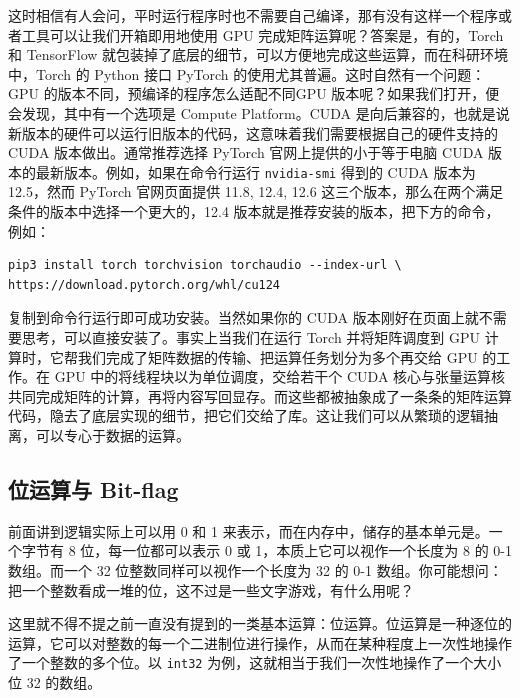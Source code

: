 这时相信有人会问，平时运行程序时也不需要自己编译，那有没有这样一个程序或者工具可以让我们开箱即用地使用 GPU 完成矩阵运算呢？答案是，有的，Torch 和 TensorFlow 就包装掉了底层的细节，可以方便地完成这些运算，而在科研环境中，Torch 的 Python 接口 PyTorch 的使用尤其普遍。这时自然有一个问题：GPU 的版本不同，预编译的程序怎么适配不同GPU 版本呢？如果我们打开，便会发现，其中有一个选项是 Compute Platform。CUDA 是向后兼容的，也就是说新版本的硬件可以运行旧版本的代码，这意味着我们需要根据自己的硬件支持的 CUDA 版本做出。通常推荐选择 PyTorch 官网上提供的小于等于电脑 CUDA 版本的最新版本。例如，如果在命令行运行 \texttt{nvidia-smi} 得到的 CUDA 版本为 12.5，然而 PyTorch 官网页面提供 11.8, 12.4, 12.6 这三个版本，那么在两个满足条件的版本中选择一个更大的，12.4 版本就是推荐安装的版本，把下方的命令，例如：
\begin{verbatim}
pip3 install torch torchvision torchaudio --index-url \
https://download.pytorch.org/whl/cu124
\end{verbatim}
复制到命令行运行即可成功安装。当然如果你的 CUDA 版本刚好在页面上就不需要思考，可以直接安装了。事实上当我们在运行 Torch 并将矩阵调度到 GPU 计算时，它帮我们完成了矩阵数据的传输、把运算任务划分为多个再交给 GPU 的工作。在 GPU 中的将线程块以为单位调度，交给若干个 CUDA 核心与张量运算核共同完成矩阵的计算，再将内容写回显存。而这些都被抽象成了一条条的矩阵运算代码，隐去了底层实现的细节，把它们交给了库。这让我们可以从繁琐的逻辑抽离，可以专心于数据的运算。

\subsection{位运算与 Bit-flag}

前面讲到逻辑实际上可以用 0 和 1 来表示，而在内存中，储存的基本单元是。一个字节有 8 位，每一位都可以表示 0 或 1，本质上它可以视作一个长度为 8 的 0-1 数组。而一个 32 位整数同样可以视作一个长度为 32 的 0-1 数组。你可能想问：把一个整数看成一堆的位，这不过是一些文字游戏，有什么用呢？

这里就不得不提之前一直没有提到的一类基本运算：位运算。位运算是一种逐位的运算，它可以对整数的每一个二进制位进行操作，从而在某种程度上一次性地操作了一个整数的多个位。以 \texttt{int32} 为例，这就相当于我们一次性地操作了一个大小位 32 的数组。

